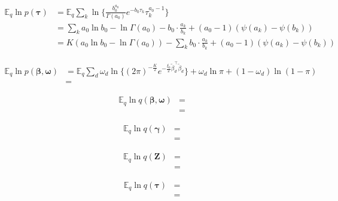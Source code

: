 \documentclass[twoside,11pt]{article}
\newcommand{\transpose}[1]{#1^{\intercal}}
\newcommand{\ksum}{\sum\limits_{k}}
\newcommand{\boldbeta}{\boldsymbol\beta}
\newcommand{\boldgamma}{\boldsymbol\gamma}
\newcommand{\boldomega}{\boldsymbol\omega}
\newcommand{\boldtau}{\boldsymbol\tau}
\newcommand{\E}{\mathbb{E}}
\newcommand{\betad}{\tilde{\beta}_d}
\begin{document}
\begin{align*}
	\E_q \ln p\left( \boldtau \right) &= \E_q \ksum \ln \Big\{ \frac{b_0^{a_0}}{\Gamma(a_0)} e^{-b_0 \tau_k} \tau_k^{a_0 - 1} \Big\} \\
	&= \ksum a_0 \ln b_0 - \ln \Gamma(a_0) - b_0 \cdot \frac{a_k}{b_k} + (a_0 - 1) \left( \psi(a_k) - \psi(b_k) \right) \\
	&= K \left( a_0 \ln b_0 - \ln \Gamma(a_0) \right) - \ksum b_0 \cdot \frac{a_k}{b_k} + (a_0 - 1) \left( \psi(a_k) - \psi(b_k) \right)
\end{align*}


\begin{align*}
	\E_q \ln p\left( \boldbeta, \boldomega \right) &= \E_q \sum_d \omega_d \ln \Big\{ (2\pi)^{-\frac{K}{2}} e^{-\frac{\xi_0}{2} \transpose{\betad} \betad}\Big\} + \omega_d \ln \pi + (1 - \omega_d) \ln \left( 1 - \pi \right) \\
	&= 
\end{align*}


\begin{align*}
	\E_q \ln q\left( \boldbeta, \boldomega \right) &= \\
	&= 
\end{align*}

\begin{align*}
	\E_q \ln q\left( \boldgamma \right) &= \\
	&= 
\end{align*}

\begin{align*}
	\E_q \ln q\left( \mathbf{Z} \right) &= \\
	&= 
\end{align*}

\begin{align*}
	\E_q \ln q\left( \boldtau \right) &= \\
	&= 
\end{align*}



\vskip 0.2in
\printbibliography
\end{document}
